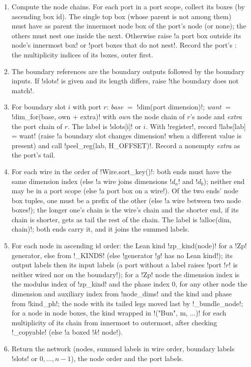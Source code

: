 {\begin{algorithm}[\py!translate(d, slots, alloc, register=True, dims_out=None)!]\label{alg:lean-export-net-translate}
\begin{enumerate}
\item Compute the node chains. For each port in a port scope, collect its boxes (by ascending box
  id). The single top box (whose parent is not among them) must have as parent the innermost node
  box of the port's node (or none); the others must nest one inside the next. Otherwise raise
  \code!a port box outside its node's innermost box! or \code!port boxes that do not nest!. Record
  the port's : the multiplicity indices of its boxes, outer first.
\item The boundary references are the boundary outputs followed by the boundary inputs. If
  \py!slots! is given and its length differs, raise \code!the boundary does not match!.
\item For boundary slot $i$ with port $r$: \textit{base} $=$ \py!dim(port dimension)!;
  \textit{want} $=$ \py!dim_for(base, own + extra)! with \textit{own} the node chain of $r$'s node
  and \textit{extra} the port chain of $r$. The label is \py!slots[i]! or $i$. With
  \py!register!, record \py!labs[lab] = want! (raise \code!a boundary slot changes dimension! when
  a different value is present) and call \py!peel_reg(lab, H_OFFSET)!. Record a nonempty
  \textit{extra} as the port's tail.
\item For each wire in the order of \py!Wire.sort_key()!: both ends must have the same dimension
  index (else \code!a wire joins dimensions !$d_a$\code! and !$d_b$); neither end may be in a port
  scope (else \code!a port box on a wire!). Of the two ends' node box tuples, one must be a prefix
  of the other (else \code!a wire between two node boxes!); the longer one's chain is the wire's
  chain and the shorter end, if its chain is shorter, gets as tail the rest of the chain. The
  label is \py!alloc(dim, chain)!; both ends carry it, and it joins the summed labels.
\item For each node in ascending id order: the Lean kind \py!zp_kind(node)! for a \code!Zp!
  generator, else from \py!_KINDS! (else \code!generator !$g$\code! has no Lean kind!); its output
  labels then its input labels (a port without a label raises
  \code!port !$r$\code! is neither wired nor on the boundary!); for a \code!Zp! node the dimension
  index is the modulus index of \py!zp_kind! and the phase index 0, for any other node the
  dimension and auxiliary index from \py!node_dims! and the kind and phase from \py!kind_ph!; the
  node with its tailed legs moved last by \py!_bundle_node!; for a node in node boxes, the kind
  wrapped in \code!("Bun", m, ...)! for each multiplicity of its chain from innermost to
  outermost, after checking \py!_copyable! (else \code!a boxed !$k$\code! node!).
\item Return the network (nodes, summed labels in wire order, boundary labels \py!slots! or
  $0,\dots,n-1$), the node order and the port labels.
\end{enumerate}
\end{algorithm}

}
